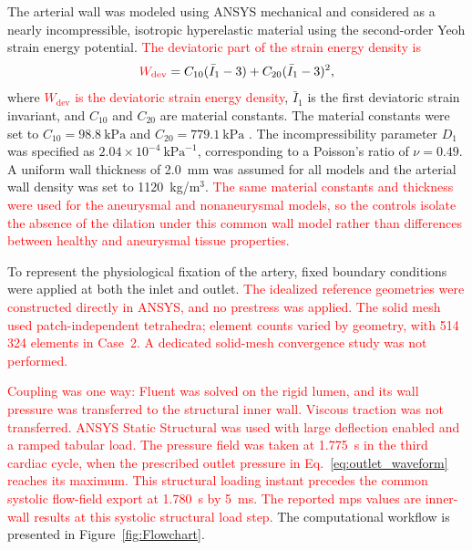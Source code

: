 \documentclass[12pt,a4paper]{article}
\newcommand{\cfdrevision}[1]{\textcolor{red}{#1}}
\newcommand{\MPS}{\ac{mps}\xspace}
\theoremstyle{definition}
\numberwithin{equation}{section}
\begin{document}
The arterial wall was modeled using ANSYS mechanical and considered as a nearly incompressible, isotropic hyperelastic material using the second-order Yeoh strain energy potential. \cfdrevision{The deviatoric part of the strain energy density is}
\begin{equation}
\textcolor{red}{W_{\mathrm{dev}}} = C_{10}(\bar{I}_1 - 3) + C_{20}(\bar{I}_1 - 3)^2,
\label{eq:yeoh}
\end{equation}
where \cfdrevision{\(W_{\mathrm{dev}}\) is the deviatoric strain energy density}, \(\bar{I}_1\) is the first deviatoric strain invariant, and \(C_{10}\) and \(C_{20}\) are material constants. The material constants were set to \(C_{10} = 98.8~\text{kPa}\) and \(C_{20} = 779.1~\text{kPa}\) \cite{zhu2025combined}. The incompressibility parameter \(D_1\) was specified as \(2.04 \times 10^{-4}~\text{kPa}^{-1}\), corresponding to a Poisson's ratio of \(\nu = 0.49\). A uniform wall thickness of 2.0~mm was assumed for all models and the arterial wall density was set to 1120~kg/m\(^3\). \cfdrevision{The same material constants and thickness were used for the aneurysmal and nonaneurysmal models, so the controls isolate the absence of the dilation under this common wall model rather than differences between healthy and aneurysmal tissue properties.}

To represent the physiological fixation of the artery, fixed boundary conditions were applied at both the inlet and outlet. \cfdrevision{The idealized reference geometries were constructed directly in ANSYS, and no prestress was applied. The solid mesh used patch-independent tetrahedra; element counts varied by geometry, with 514\,324 elements in Case~2. A dedicated solid-mesh convergence study was not performed.}

\cfdrevision{Coupling was one way: Fluent was solved on the rigid lumen, and its wall pressure was transferred to the structural inner wall. Viscous traction was not transferred. ANSYS Static Structural was used with large deflection enabled and a ramped tabular load. The pressure field was taken at 1.775~s in the third cardiac cycle, when the prescribed outlet pressure in Eq.~\eqref{eq:outlet_waveform} reaches its maximum. This structural loading instant precedes the common systolic flow-field export at 1.780~s by 5~ms. The reported \MPS values are inner-wall results at this systolic structural load step.} The computational workflow is presented in Figure~\ref{fig:Flowchart}.
\end{document}
